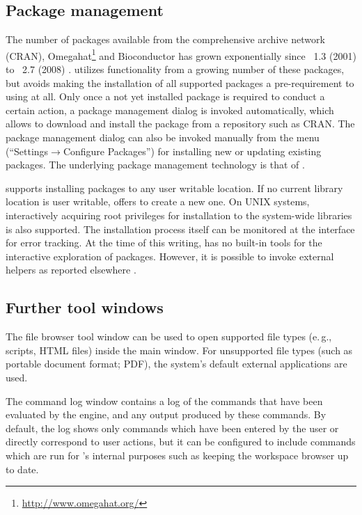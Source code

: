 \subsection{Package management}
\label{sec:package_management}
The number of  packages available from the comprehensive  archive
network (CRAN), Omegahat\footnote{\url{http://www.omegahat.org/}} and Bioconductor \citep{Gentleman2004} has grown exponentially since \, 1.3
(2001) to \, 2.7 (2008) \citep{Fox2008, Ligges2003, Visne2009}. 
utilizes functionality from a growing number of these packages, but avoids
making the installation of all supported packages a pre-requirement to using
 at all. Only once a not yet installed package is required to conduct a certain
action, a package management dialog is invoked automatically, which allows to
download and install the package from a repository such as CRAN. The package
management dialog can also be invoked manually from the menu
(``Settings$\rightarrow$Configure Packages'') for installing new or updating existing 
packages. The underlying package management technology is that of 
\citep{Ligges2003, Ripley2005}.

 supports installing packages to any user writable location. If no current
library location is user writable,  offers to create a new one. 
On UNIX systems, interactively acquiring root privileges for
installation to the system-wide libraries is also supported.
The installation process
itself can be monitored at the interface for error tracking. At the time of this writing,  has no
built-in tools for the interactive exploration of  packages. However, it is
possible to invoke external helpers as reported elsewhere \citep{Zhang2004}.

\subsection{Further tool windows}
\label{sec:further_tool_windows}

The file browser tool window can be
used to open supported file types (e.\,g., 
scripts, HTML files) inside the main 
window. For unsupported file types (such as portable document format; PDF), the
system's default external applications are used.

The command log window contains a log of the commands that have been
evaluated by the  engine, and any output
produced by these commands. By default, the log shows only commands
which have been entered by the user or directly correspond to user
actions, but it can be configured to include commands which are run for
's internal purposes such as keeping the workspace browser up
to date.

